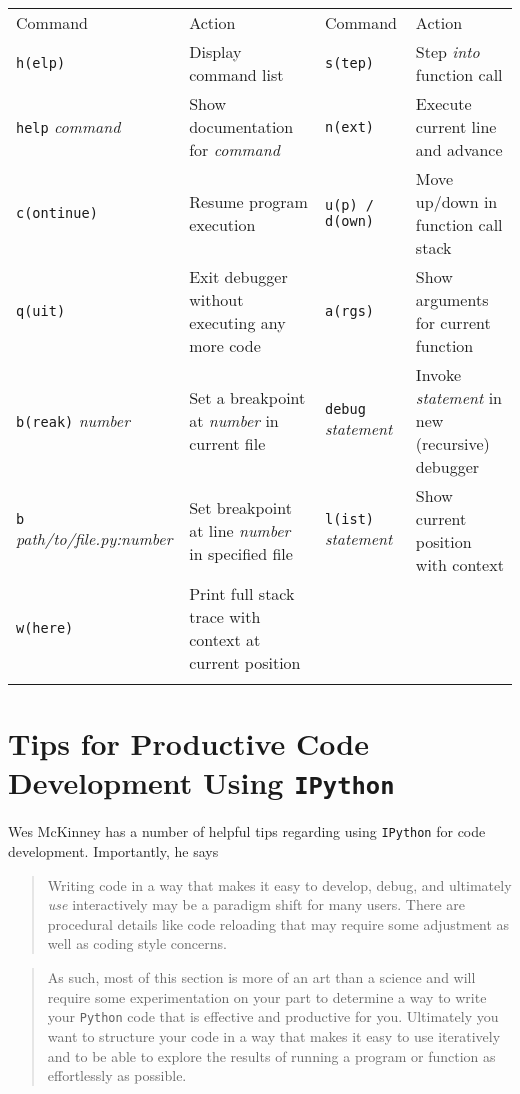 \documentclass{article}
\begin{document}
\begin{longtable}[c]{@{}llll@{}}
\toprule\addlinespace
Command & Action & Command & Action
\\\addlinespace
\midrule\endhead
\texttt{h(elp)} & Display command list & \texttt{s(tep)} & Step
\emph{into} function call
\\\addlinespace
\texttt{help} \emph{command} & Show documentation for \emph{command} &
\texttt{n(ext)} & Execute current line and advance
\\\addlinespace
\texttt{c(ontinue)} & Resume program execution & \texttt{u(p) / d(own)}
& Move up/down in function call stack
\\\addlinespace
\texttt{q(uit)} & Exit debugger without executing any more code &
\texttt{a(rgs)} & Show arguments for current function
\\\addlinespace
\texttt{b(reak)} \emph{number} & Set a breakpoint at \emph{number} in
current file & \texttt{debug} \emph{statement} & Invoke \emph{statement}
in new (recursive) debugger
\\\addlinespace
\texttt{b} \emph{path/to/file.py:number} & Set breakpoint at line
\emph{number} in specified file & \texttt{l(ist)} \emph{statement} &
Show current position with context
\\\addlinespace
\texttt{w(here)} & Print full stack trace with context at current
position
\\\addlinespace
\bottomrule
\end{longtable}

    \section{Tips for Productive Code Development Using
\texttt{IPython}}\label{tips-for-productive-code-development-using-ipython}

Wes McKinney has a number of helpful tips regarding using
\texttt{IPython} for code development. Importantly, he says

\begin{quote}
Writing code in a way that makes it easy to develop, debug, and
ultimately \emph{use} interactively may be a paradigm shift for many
users. There are procedural details like code reloading that may require
some adjustment as well as coding style concerns.
\end{quote}

\begin{quote}
As such, most of this section is more of an art than a science and will
require some experimentation on your part to determine a way to write
your \texttt{Python} code that is effective and productive for you.
Ultimately you want to structure your code in a way that makes it easy
to use iteratively and to be able to explore the results of running a
program or function as effortlessly as possible.
\end{quote}
\end{document}
